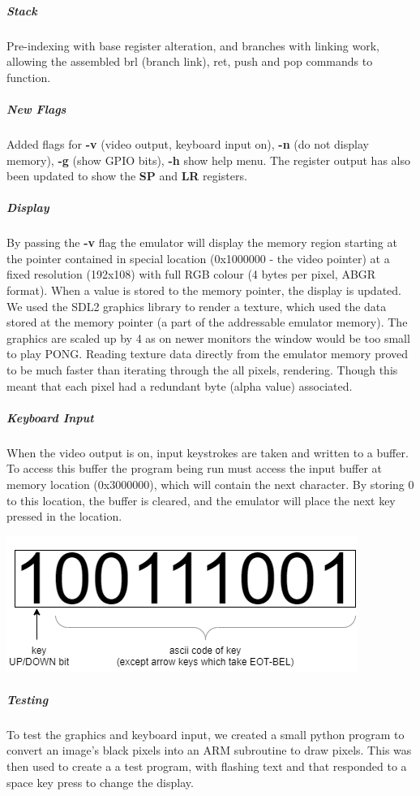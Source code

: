 \documentclass[11pt]{article}
\begin{document}
\subparagraph*{Stack}
Pre-indexing with base register alteration, and branches with linking work, allowing the assembled brl (branch link), ret, push and pop commands to function.
\subparagraph*{New Flags}
Added flags for \textbf{-v} (video output, keyboard input on), \textbf{-n} (do not display memory), \textbf{-g} (show GPIO bits), \textbf{-h} show help menu. The register output has also been updated to show the \textbf{SP} and \textbf{LR} registers.
\subparagraph*{Display}
By passing the \textbf{-v} flag the emulator will display the memory region starting at the pointer contained in special location (0x1000000 - the video pointer) at a fixed resolution (192x108) with full RGB colour (4 bytes per pixel, ABGR format). When a value is stored to the memory pointer, the display is updated.
\newline\newline We used the SDL2 graphics library to render a texture, which used the data stored at the memory pointer (a part of the addressable emulator memory). The graphics are scaled up by 4 as on newer monitors the window would be too small to play PONG.
\newline\newline Reading texture data directly from the emulator memory proved to be much faster than iterating through the all pixels, rendering. Though this meant that each pixel had a redundant byte (alpha value) associated.
\subparagraph{Keyboard Input}
When the video output is on, input keystrokes are taken and written to a buffer. To access this buffer the program being run must access the input buffer at memory location (0x3000000), which will contain the next character. By storing 0 to this location, the buffer is cleared, and the emulator will place the next key pressed in the location.
\begin{center}
	\includegraphics[scale = 0.5]{emulator keyboard input}
\end{center}
\subparagraph*{Testing}
To test the graphics and keyboard input, we created a small python program to convert an image's black pixels into an ARM subroutine to draw pixels. This was then used to create a a test program, with flashing text and that responded to a space key press to change the display.
\end{document}
